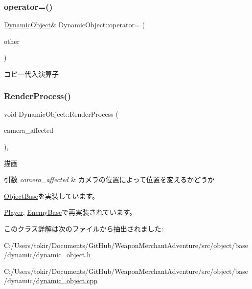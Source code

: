 \subsubsection{\texorpdfstring{operator=()}{operator=()}}
{\footnotesize\ttfamily \mbox{\hyperlink{class_dynamic_object}{Dynamic\+Object}}\& Dynamic\+Object\+::operator= (\begin{DoxyParamCaption}\item[{const \mbox{\hyperlink{class_dynamic_object}{Dynamic\+Object}} \&}]{other }\end{DoxyParamCaption})\hspace{0.3cm}{\ttfamily [inline]}}



コピー代入演算子 

\mbox{\label{class_dynamic_object_aa7488e1b4dfd7049447535d93d9d6783}} 
\subsubsection{\texorpdfstring{Render\+Process()}{RenderProcess()}}
{\footnotesize\ttfamily void Dynamic\+Object\+::\+Render\+Process (\begin{DoxyParamCaption}\item[{bool}]{camera\+\_\+affected }\end{DoxyParamCaption})\hspace{0.3cm}{\ttfamily [protected]}, {\ttfamily [virtual]}}



描画 


\begin{DoxyParams}{引数}
{\em camera\+\_\+affected} & カメラの位置によって位置を変えるかどうか \\
\hline
\end{DoxyParams}


\mbox{\hyperlink{class_object_base_aeac51d868beeb7f7fe900407b76b93a2}{Object\+Base}}を実装しています。



\mbox{\hyperlink{class_player_a8ac2e54fe5672d32186456b9735c02c3}{Player}}, \mbox{\hyperlink{class_enemy_base_af874ce6fc410fddc7d55ffd7c7bedac8}{Enemy\+Base}}で再実装されています。



このクラス詳解は次のファイルから抽出されました\+:\begin{DoxyCompactItemize}
\item 
C\+:/\+Users/tokir/\+Documents/\+Git\+Hub/\+Weapon\+Merchant\+Adventure/src/object/base/dynamic/\mbox{\hyperlink{dynamic__object_8h}{dynamic\+\_\+object.\+h}}\item 
C\+:/\+Users/tokir/\+Documents/\+Git\+Hub/\+Weapon\+Merchant\+Adventure/src/object/base/dynamic/\mbox{\hyperlink{dynamic__object_8cpp}{dynamic\+\_\+object.\+cpp}}\end{DoxyCompactItemize}
